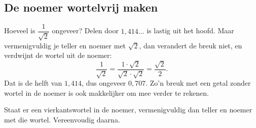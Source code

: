 
\begin{oefeningen}
\end{oefeningen}

\subsection{De noemer wortelvrij maken}

Hoeveel is $\dfrac{1}{\sqrt2}$ ongeveer? Delen door $1,414\ldots$ is lastig uit het hoofd. Maar vermenigvuldig je teller en noemer met $\sqrt2$, dan verandert de breuk niet, en verdwijnt de wortel uit de noemer:
\[ \frac{1}{\sqrt2} = \frac{1 \cdot \sqrt2}{\sqrt2 \cdot \sqrt2} = \frac{\sqrt2}{2} . \]
Dat is de helft van $1,414$, dus ongeveer $0,707$. Zo'n breuk met een getal zonder wortel in de noemer is ook makkelijker om mee verder te rekenen.


\begin{werkwijze}
Staat er een vierkantswortel in de noemer, vermenigvuldig dan teller en noemer met die wortel. Vereenvoudig daarna.
\end{werkwijze}

